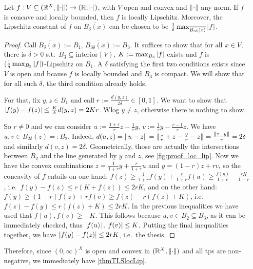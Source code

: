 \begin{theorem}%
Let $f:V\subseteq (\mathbb{R}^X,\lVert\cdot\rVert) \to (\mathbb{R},\left\lvert\cdot\right\rvert)$, with $V$ open and convex and $\lVert\cdot\rVert$ any norm.
If $f$ is concave and locally bounded, then $f$ is locally Lipschitz.
Moreover, the Lipschitz constant of $f$ on $\overline{B_{\delta}(x)}$ can be chosen to be $\frac{1}{\delta}\max_{\overline{B_{3\delta}(x)}} \left\lvert f\right\rvert$.
\end{theorem}
\begin{proof}
 Call $\overline{B_{\delta}(x)}:=B_1$, $\overline{B_{3\delta}(x)}:=B_3$.
 It suffices to show that for all $x\in V$, there is $\delta>0$ s.t.\ $B_3\subseteq \mathrm{interior}(V)$, $K:=\max_{B_3}  \left\lvert f\right\rvert$ exists and $f$ is $(\frac{1}{\delta}\max_{B_3} \left\lvert f\right\rvert)$-Lipschitz on $B_1$.
 A $\delta$ satisfying the first two conditions exists since $V$ is open and bcause $f$ is locally bounded and $B_3$ is compact.
 We will show that for all such $\delta$, the third condition already holds.

 For that, fix $y,z\in B_1$ and call $r:=\frac{d(y,z)}{2\delta}\in[0,1]$.
 We want to show that $\left\lvert f(y)-f(z)\right\rvert\leq \frac{K}{\delta}d(y,z)=2Kr$.
 Wlog $y\neq z$, otherwise there is nothing to show.

 So $r\neq 0$ and we can consider $u:=\frac{1+r}{r}z-\frac{1}{r}y$, $v:=\frac{1}{r}y-\frac{r-1}{r}z$.
 We have $u,v\in \overline{B_{2\delta}(z)}=:B_2$.
 Indeed, $d(u,z)=\lVert u-z\rVert=\lVert\frac{z}{r}+z-\frac{y}{r}-z\rVert=\frac{\lVert z-y\rVert}{r}=2\delta$ and similarly $d(v,z)=2\delta$.
 Geometrically, those are actually the intersections between $B_2$ and the line generated by $y$ and $z$, see \autoref{fig:proof_loc_lip}.
 Now we have the convex combinations $z=\frac{1}{1+r}y+\frac{r}{1+r}u$ and $y=(1-r)z+rv$, so the concavity of $f$ entails on one hand:
 $f(z)\geq \frac{1}{1+r}f(y)+\frac{r}{1+r}f(u)\geq \frac{f(y)}{1+r} - \frac{rK}{1+r}$, i.e.\ $f(y)-f(z)\leq r(K+f(z))\leq 2rK$, and on the other hand:
 $f(y)\geq (1-r)f(z)+rf(v)\geq f(z)-r(f(z)+K)$, i.e.\ $f(z)-f(y)\leq r(f(z)+K)\leq 2rK$.
 In the previous inequalities we have used that $f(u),f(v)\geq -K$.
 This follows because $u,v\in B_2\subseteq B_3$, as it can be immediately checked, thus $\left\lvert f(u)\right\rvert,\left\lvert f(v)\right\rvert\leq K$.
 Putting the final inequalities together, we have $\left\lvert f(y)-f(z)\right\rvert\leq 2rK$, i.e.\ the thesis.
\end{proof}

Therefore, since $(0,\infty)^X$ is open and convex in $(\mathbb{R}^X,\lVert\cdot\rVert)$ and all tps are non-negative, we immediately have \autoref{thmTLSlocLip}.
